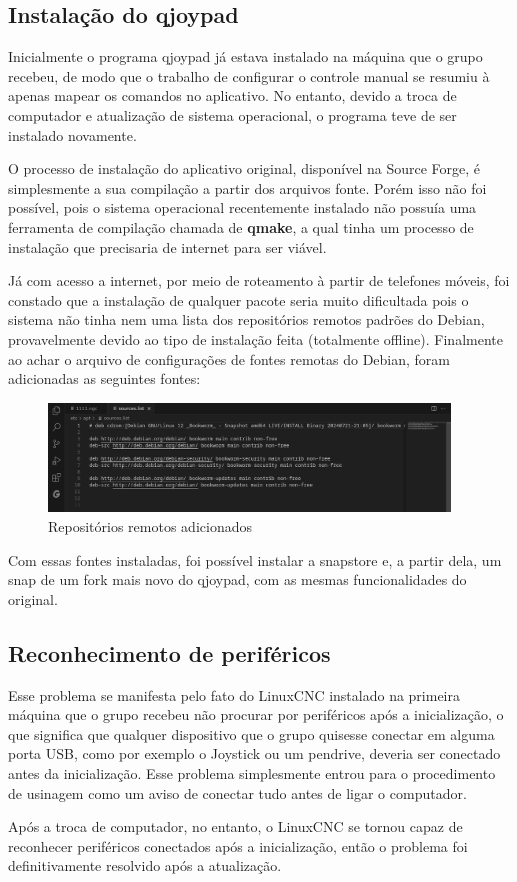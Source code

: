 \subsection{Instalação do qjoypad}

Inicialmente o programa qjoypad já estava instalado na máquina que o grupo recebeu, de modo que o trabalho de configurar o controle manual se resumiu à apenas mapear os comandos no aplicativo. No entanto, devido a troca de computador e atualização de sistema operacional, o programa teve de ser instalado novamente. 

O processo de instalação do aplicativo original, disponível na Source Forge, é simplesmente a sua compilação a partir dos arquivos fonte. Porém isso não foi possível, pois o sistema operacional recentemente instalado não possuía uma ferramenta de compilação chamada de \textbf{qmake}, a qual tinha um processo de instalação que precisaria de internet para ser viável. 

Já com acesso a internet, por meio de roteamento à partir de telefones móveis, foi constado que a instalação de qualquer pacote seria muito dificultada pois o sistema não tinha nem uma lista dos repositórios remotos padrões do Debian, provavelmente devido ao tipo de instalação feita (totalmente offline). Finalmente ao achar o arquivo de configurações de fontes remotas do Debian, foram adicionadas as seguintes fontes:

\begin{figure}[H]
    \begin{center}
        \includegraphics[width=0.95\textwidth]{images/prog/fontes.png}
    \end{center}
    \caption{Repositórios remotos adicionados}\label{fontes}
\end{figure}

Com essas fontes instaladas, foi possível instalar a snapstore e, a partir dela, um snap de um fork mais novo do qjoypad, com as mesmas funcionalidades do original.

\subsection{Reconhecimento de periféricos}

Esse problema se manifesta pelo fato do LinuxCNC instalado na primeira máquina que o grupo recebeu não procurar por periféricos após a inicialização, o que significa que qualquer dispositivo que o grupo quisesse conectar em alguma porta USB, como por exemplo o Joystick ou um pendrive, deveria ser conectado antes da inicialização. Esse problema simplesmente entrou para o procedimento de usinagem como um aviso de conectar tudo antes de ligar o computador. 

Após a troca de computador, no entanto, o LinuxCNC se tornou capaz de reconhecer periféricos conectados após a inicialização, então o problema foi definitivamente resolvido após a atualização.
